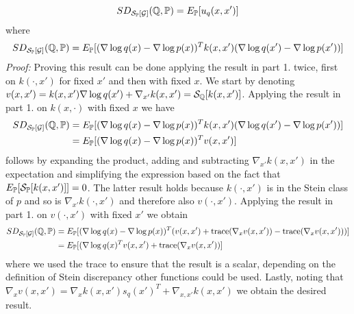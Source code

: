 \begin{enumerate}
\begin{equation*}
	SD_{\mathcal{S}_{\mathbb{P}}[\mathcal{G}]}(\mathbb{Q}, \mathbb{P}) = E_{\mathbb{P}}[u_q(x, x')] 
	\end{equation*}
	where 
	\begin{equation*}
	SD_{\mathcal{S}_{\mathbb{P}}[\mathcal{G}]}(\mathbb{Q}, \mathbb{P}) = E_{\mathbb{P}}[(\nabla \log q(x) - \nabla \log p(x))^T k(x, x') (\nabla \log q(x') - \nabla \log p(x'))]
	\end{equation*}
	\emph{Proof:} Proving this result can be done applying the result in part 1. twice, first on $k(\cdot, x')$ for fixed $x'$ and then with fixed $x$. We start by denoting $v(x, x') = k(x, x')\nabla \log q(x') + \nabla_{x'}k(x, x') = \mathcal{S}_{\mathbb{Q}}[k(x, x')]$. Applying the result in part 1. on $k(x, \cdot)$ with fixed $x$ we have
	\begin{equation*}
	\begin{split}
	SD_{\mathcal{S}_{\mathbb{P}}[\mathcal{G}]}(\mathbb{Q}, \mathbb{P}) &= E_{\mathbb{P}}[(\nabla \log q(x) - \nabla \log p(x))^T k(x, x') (\nabla \log q(x') - \nabla \log p(x'))] \\ &=  E_{\mathbb{P}}[(\nabla \log q(x) - \nabla \log p(x))^T v(x, x')]
	\end{split}
	\end{equation*}
	follows by expanding the product, adding and subtracting $\nabla_{x'}k(x, x')$ in the expectation and simplifying the expression based on the fact that $E_{\mathbb{P}}[\mathcal{S}_{\mathbb{P}}[k(x, x')]] = 0$. The latter result holds because $k(\cdot, x')$ is in the Stein class of $p$ and so is $\nabla_{x'}k(\cdot, x')$ and therefore also $v(\cdot, x')$. Applying the result in part 1. on $v(\cdot, x')$ with fixed $x'$ we obtain
	\begin{equation*}
	\begin{split}
SD_{\mathcal{S}_{\mathbb{P}}[\mathcal{G}]}(\mathbb{Q}, \mathbb{P}) &=  E_{\mathbb{P}}[(\nabla \log q(x) - \nabla \log p(x))^T (v(x, x') + \text{trace}(\nabla_x v(x, x')) - \text{trace}(\nabla_x v(x, x')))] \\
	&=E_{\mathbb{P}}[(\nabla \log q(x)^T v(x, x') + \text{trace}(\nabla_x v(x, x'))]
	\end{split}
	\end{equation*}
	where we used the trace to ensure that the result is a scalar, depending on the definition of Stein discrepancy other functions could be used. Lastly, noting that $\nabla_x v(x, x') = \nabla_x k(x, x')s_q(x')^T + \nabla_{x, x'}k(x, x')$ we obtain the desired result.
\end{enumerate} 
